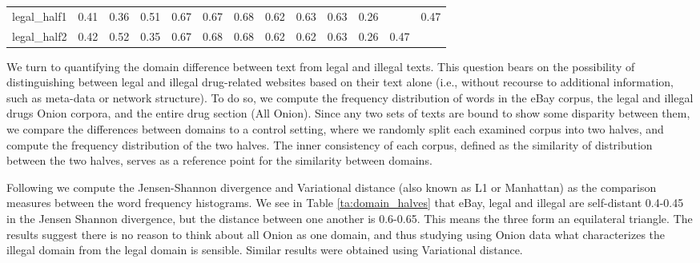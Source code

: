 \documentclass[11pt,a4paper,table]{article}
\newcommand{\oa}[1]{\footnote{\color{red}OA: #1}}
\newcommand{\daniel}[1]{\footnote{\color{brown}DH: #1}}
\begin{document}
\begin{table*}[]
{\begin{tabular}{@{}lllllllllllll@{}}
            legal\_half1     & 0.41      & 0.36             & 0.51             & 0.67 & 0.67        & 0.68        & 0.62    & 0.63           & 0.63           & 0.26  &              & 0.47         \\
            legal\_half2     & 0.42      & 0.52             & 0.35             & 0.67 & 0.68        & 0.68        & 0.62    & 0.62           & 0.63           & 0.26  & 0.47         &              \\          
        \end{tabular}%
    }
    \caption{Jensen-Shannon divergence between word distribution in all Onion drug sites, legal and illegal Onion drug sites, and eBay sites.
    Each domain was also split in half for within-domain comparison. \label{ta:domain_halves}}
    
\end{table*}

    We turn to quantifying the domain difference between text from legal and illegal texts. This question bears on the possibility of distinguishing between legal and illegal drug-related websites based on their text alone (i.e., without recourse to additional information, such as meta-data or network structure). 
    To do so, we compute the frequency distribution of words in the eBay corpus, the legal and illegal drugs Onion corpora, and the entire drug section (All Onion). 
    Since any two sets of texts are bound to show some disparity between them, we compare the differences between domains to a control setting, where we randomly split each examined corpus into two halves, and compute the frequency distribution of the two halves. The inner consistency of each corpus, defined as the similarity of distribution between the two halves, serves as a reference point for the similarity between domains.
    
    Following \citet{Plank2011EffectiveMO} we compute the Jensen-Shannon divergence and Variational distance (also known as L1 or Manhattan) as the comparison measures between the word frequency histograms.%
    We see in Table \ref{ta:domain_halves} that eBay, legal and illegal are self-distant 0.4-0.45 in the Jensen Shannon divergence, but the distance between one another is 0.6-0.65. This means the three form an equilateral triangle. 
    The results suggest there is no reason to think about all Onion as one domain, and thus studying using Onion data what characterizes the illegal domain from the legal domain is sensible. Similar results were obtained using Variational distance.
\end{document}
